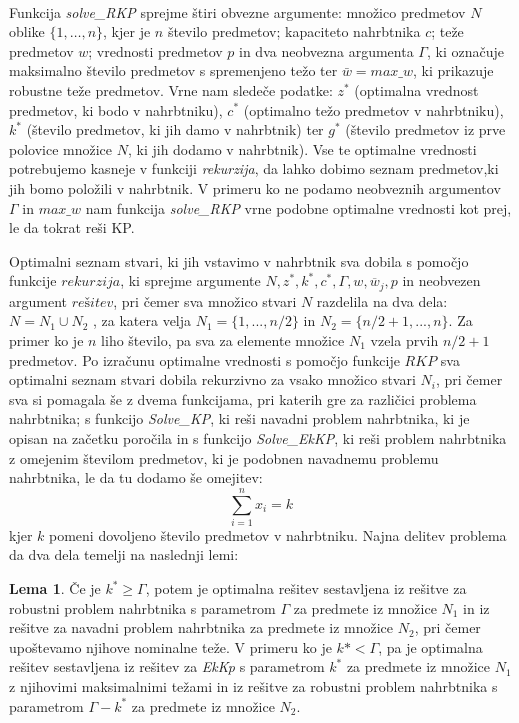 \documentclass[a4paper,12pt]{article}
\theoremstyle{definition}
\newtheorem{definition}{Lema}
\begin{document}
\paragraph{}
Funkcija \textit{solve\_RKP} sprejme štiri obvezne argumente: množico predmetov $N$ oblike
$\{1, \dots, n\}$, kjer je $n$ število predmetov; kapaciteto nahrbtnika $c$; teže predmetov $w$; vrednosti predmetov $p$ in dva neobvezna
argumenta $\Gamma$, ki označuje maksimalno število predmetov s spremenjeno težo ter $\bar{w} = max\_w$, ki prikazuje robustne teže predmetov. 
Vrne nam sledeče podatke: $z^{*}$ (optimalna vrednost predmetov, ki bodo v nahrbtniku), $c^{*}$ (optimalno težo predmetov v nahrbtniku), $k^{*}$ (število 
predmetov, ki jih damo v nahrbtnik) ter $g^{*}$ (število predmetov iz prve polovice množice $N$, ki jih dodamo v nahrbtnik). Vse te optimalne 
vrednosti potrebujemo kasneje v funkciji \textit{rekurzija}, da lahko dobimo seznam predmetov,ki jih bomo položili v nahrbtnik. V primeru ko 
ne podamo neobveznih argumentov $\Gamma$ in $max\_w$ nam funkcija \textit{solve\_RKP} vrne podobne optimalne vrednosti kot prej, le da tokrat 
reši KP.
\par


Optimalni seznam stvari, ki jih vstavimo v nahrbtnik sva dobila s pomočjo funkcije $rekurzija$,
ki sprejme argumente $N, z^*, k^*, c^*,  \Gamma, w, \overline{w}_{j}, p$ in neobvezen argument 
$rešitev$,  pri čemer sva množico stvari $N$ razdelila na dva dela: $N = N_1 \cup N_2$ , za 
katera velja $N_1 = \{1, ..., n / 2\} $ in $N_2 = \{n / 2 + 1, ..., n\}$. Za primer ko je $n$ 
liho število, pa sva za elemente množice $N_1$ vzela prvih $n / 2 + 1$ predmetov. Po izračunu
optimalne vrednosti s pomočjo funkcije $RKP$ sva optimalni seznam stvari dobila rekurzivno za 
vsako množico stvari $N_i$, pri čemer sva si pomagala še z dvema funkcijama, pri katerih gre 
za različici problema nahrbtnika; s funkcijo \textit{Solve\_KP}, ki reši navadni problem
nahrbtnika, ki je opisan na začetku poročila in s funkcijo \textit{Solve\_EkKP}, ki reši 
problem nahrbtnika z omejenim številom predmetov, ki je podobnen navadnemu problemu nahrbtnika, 
le da tu dodamo še omejitev:
\begin{equation}
\sum_{i=1}^{n}x_i = k
\end{equation} kjer $k$ pomeni dovoljeno število predmetov v nahrbtniku.
Najna delitev problema da dva dela temelji na naslednji lemi:
\begin{definition}
Če je $k^* \geq \Gamma$, potem je optimalna rešitev sestavljena iz rešitve za robustni problem 
nahrbtnika s parametrom $\Gamma$ za predmete iz množice $N_1$ in iz rešitve za navadni problem 
nahrbtnika za predmete iz množice $N_2$, pri čemer upoštevamo njihove nominalne teže. 
V primeru ko  je $k* < \Gamma$, pa je optimalna rešitev sestavljena iz rešitev za
\textit{E\-kKp} s parametrom $k^*$ za predmete iz množice $N_1$ z njihovimi maksimalnimi 
težami in iz rešitve za robustni problem nahrbtnika s parametrom   $\Gamma - k^*$ za predmete 
iz množice $N_2$.
\end{definition}
\end{document}
